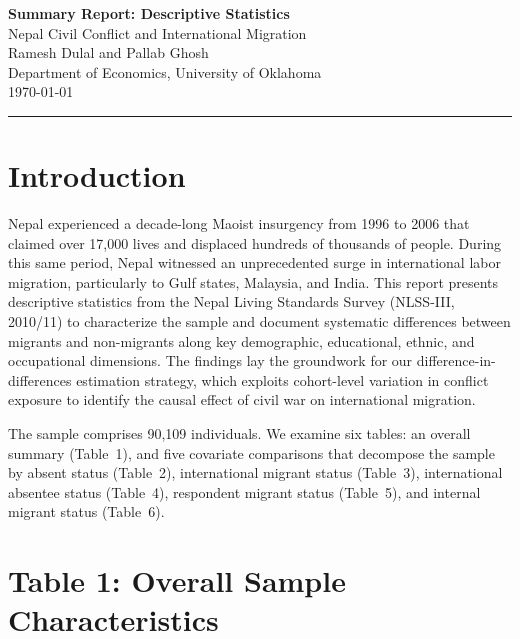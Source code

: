 \documentclass[12pt,letterpaper]{article}
\begin{document}
\begin{center}
    {\LARGE \textbf{Summary Report: Descriptive Statistics}} \\[0.5em]
    {\large Nepal Civil Conflict and International Migration} \\[0.5em]
    {\normalsize Ramesh Dulal and Pallab Ghosh} \\[0.3em]
    {\normalsize Department of Economics, University of Oklahoma} \\[0.3em]
    {\normalsize \today} \\[0.5em]
    \rule{0.6\textwidth}{0.4pt}
\end{center}

\vspace{0.5em}

\section{Introduction}

Nepal experienced a decade-long Maoist insurgency from 1996 to 2006 that claimed over 17,000 lives and displaced hundreds of thousands of people. During this same period, Nepal witnessed an unprecedented surge in international labor migration, particularly to Gulf states, Malaysia, and India. This report presents descriptive statistics from the Nepal Living Standards Survey (NLSS-III, 2010/11) to characterize the sample and document systematic differences between migrants and non-migrants along key demographic, educational, ethnic, and occupational dimensions. The findings lay the groundwork for our difference-in-differences estimation strategy, which exploits cohort-level variation in conflict exposure to identify the causal effect of civil war on international migration.

The sample comprises 90,109 individuals. We examine six tables: an overall summary (Table~1), and five covariate comparisons that decompose the sample by absent status (Table~2), international migrant status (Table~3), international absentee status (Table~4), respondent migrant status (Table~5), and internal migrant status (Table~6).


\section{Table 1: Overall Sample Characteristics}
\end{document}
